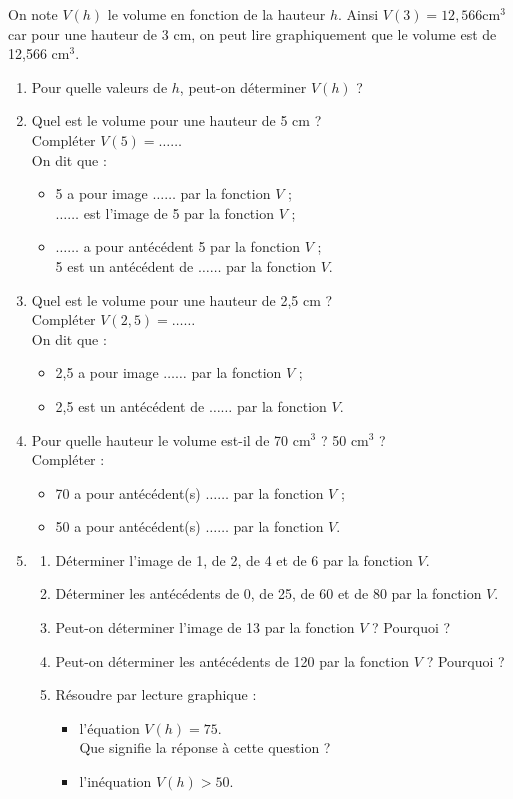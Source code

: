 On note $V(h)$ le volume en fonction de la hauteur $h$. Ainsi $V (3) =12,566 \text{cm}^3$ car pour une hauteur de 3
cm, on peut lire graphiquement que le volume est de 12,566 $\text{cm}^3$.
\begin{enumerate}
	\item Pour quelle valeurs de $h$, peut-on d\'eterminer $V(h)$ ?
	\item Quel est le volume pour une hauteur de 5 cm ? \\
	Compl\'eter $V (5) = \ldots\ldots$ \\
	On dit que :
	\begin{itemize}
		\item 5 a pour image $\ldots\ldots$ par la fonction $V$ ; \\ $\ldots\ldots$ est l'image de 5 par la fonction $V$ ;
		\item $\ldots\ldots$ a pour ant\'ec\'edent 5 par la fonction $V$ ; \\ 5 est un ant\'ec\'edent de $\ldots\ldots$ par la fonction $V$.
	\end{itemize}
	\item Quel est le volume pour une hauteur de 2,5 cm ? \\
	Compl\'eter $V (2,5) = \ldots\ldots$ \\
	On dit que :
	\begin{itemize}
		\item 2,5 a pour image $\ldots\ldots$ par la fonction $V$ ;
		\item 2,5 est un ant\'ec\'edent de $\ldots\ldots$ par la fonction $V$.
	\end{itemize}
	\item Pour quelle hauteur le volume est-il de 70 $\text{cm}^3$ ? 50 $\text{cm}^3$ ? \\
	Compl\'eter :
	\begin{itemize}
	\item 70 a pour ant\'ec\'edent(s) $\ldots\ldots$ par la fonction $V$ ;
	\item 50 a pour ant\'ec\'edent(s) $\ldots\ldots$ par la fonction $V$.
	\end{itemize}
	\item
	\begin{enumerate}
		\item D\'eterminer l'image de 1, de 2, de 4 et de 6 par la fonction $V$.
		\item D\'eterminer les ant\'ec\'edents de 0, de 25, de 60 et de 80 par la fonction $V$.
		\item Peut-on d\'eterminer l'image de 13 par la fonction $V$ ? Pourquoi ?
		\item Peut-on d\'eterminer les ant\'ec\'edents de 120 par la fonction $V$ ?
		 Pourquoi ?
		\item R\'esoudre par lecture graphique :
			\begin{itemize}
				\item l'\'equation $V(h) = 75$.\\
Que signifie la r\'eponse \`a cette question ?
				\item l'in\'equation $V(h) > 50$.
			\end{itemize}
	\end{enumerate}
\end{enumerate}
